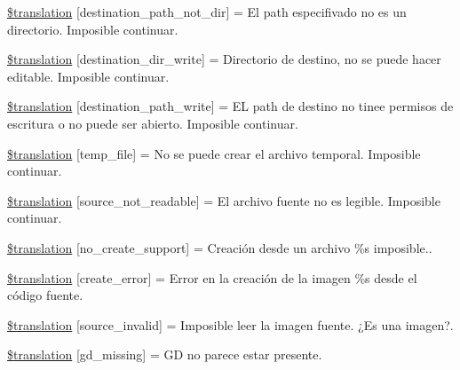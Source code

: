 \begin{DoxyCompactItemize}
\item 
\hyperlink{class_8upload_8es___e_s_8php_a5704a67137126e8c87b7a364175929d4}{\$translation} \mbox{[}\textquotesingle{}destination\+\_\+path\+\_\+not\+\_\+dir\textquotesingle{}\mbox{]} = \textquotesingle{}El path especifivado no es un directorio. Imposible continuar.\textquotesingle{}
\item 
\hyperlink{class_8upload_8es___e_s_8php_a97608ea194a616db49141a0e6dee900c}{\$translation} \mbox{[}\textquotesingle{}destination\+\_\+dir\+\_\+write\textquotesingle{}\mbox{]} = \textquotesingle{}Directorio de destino, no se puede hacer editable. Imposible continuar.\textquotesingle{}
\item 
\hyperlink{class_8upload_8es___e_s_8php_a40e4e1962226b89fd76da5819a9602b0}{\$translation} \mbox{[}\textquotesingle{}destination\+\_\+path\+\_\+write\textquotesingle{}\mbox{]} = \textquotesingle{}E\+L path de destino no tinee permisos de escritura o no puede ser abierto. Imposible continuar.\textquotesingle{}
\item 
\hyperlink{class_8upload_8es___e_s_8php_a2baece8da11e20d45175db91851ec3e3}{\$translation} \mbox{[}\textquotesingle{}temp\+\_\+file\textquotesingle{}\mbox{]} = \textquotesingle{}No se puede crear el archivo temporal. Imposible continuar.\textquotesingle{}
\item 
\hyperlink{class_8upload_8es___e_s_8php_a922967ca2df0efdd455261142d8e5715}{\$translation} \mbox{[}\textquotesingle{}source\+\_\+not\+\_\+readable\textquotesingle{}\mbox{]} = \textquotesingle{}El archivo fuente no es legible. Imposible continuar.\textquotesingle{}
\item 
\hyperlink{class_8upload_8es___e_s_8php_a346dfd1ade29f583dd20d345c436859f}{\$translation} \mbox{[}\textquotesingle{}no\+\_\+create\+\_\+support\textquotesingle{}\mbox{]} = \textquotesingle{}Creación desde un archivo \%s imposible..\textquotesingle{}
\item 
\hyperlink{class_8upload_8es___e_s_8php_a53013ce9255c4e1849098ddd9fdb2b3f}{\$translation} \mbox{[}\textquotesingle{}create\+\_\+error\textquotesingle{}\mbox{]} = \textquotesingle{}Error en la creación de la imagen \%s desde el código fuente.\textquotesingle{}
\item 
\hyperlink{class_8upload_8es___e_s_8php_a6ab0a660b457eaf2d3434b225449fdd6}{\$translation} \mbox{[}\textquotesingle{}source\+\_\+invalid\textquotesingle{}\mbox{]} = \textquotesingle{}Imposible leer la imagen fuente. ¿\+Es una imagen?.\textquotesingle{}
\item 
\hyperlink{class_8upload_8es___e_s_8php_a7f3dfcc0db4bbc0f2e7210c439798e56}{\$translation} \mbox{[}\textquotesingle{}gd\+\_\+missing\textquotesingle{}\mbox{]} = \textquotesingle{}G\+D no parece estar presente.\textquotesingle{}

\end{DoxyCompactItemize}
